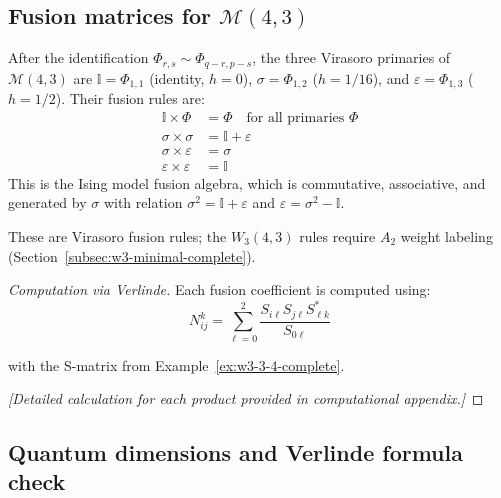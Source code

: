 \subsection{\texorpdfstring{Fusion matrices for $\mathcal{M}(4,3)$}{Fusion matrices for M(4,3)}}
\label{subsec:fusion-matrices-3-4}

\begin{theorem}\label{thm:fusion-3-4-complete}
After the identification $\Phi_{r,s} \sim \Phi_{q-r,p-s}$, the three Virasoro primaries of $\mathcal{M}(4,3)$ are $\mathbb{I} = \Phi_{1,1}$ (identity, $h=0$), $\sigma = \Phi_{1,2}$ ($h=1/16$), and $\varepsilon = \Phi_{1,3}$ ($h=1/2$).  Their fusion rules are:
\begin{align}
\mathbb{I} \times \Phi &= \Phi \quad \text{for all primaries } \Phi \\
\sigma \times \sigma &= \mathbb{I} + \varepsilon \\
\sigma \times \varepsilon &= \sigma \\
\varepsilon \times \varepsilon &= \mathbb{I}
\end{align}
This is the Ising model fusion algebra, which is commutative, associative, and generated by $\sigma$ with relation $\sigma^2 = \mathbb{I} + \varepsilon$ and $\varepsilon = \sigma^2 - \mathbb{I}$.
\end{theorem}

\begin{remark}
These are Virasoro fusion rules; the $W_3(4,3)$ rules require $A_2$ weight labeling (Section~\ref{subsec:w3-minimal-complete}).
\end{remark}

\begin{proof}[Computation via Verlinde]
Each fusion coefficient is computed using:
\[N_{ij}^k = \sum_{\ell=0}^{2} \frac{S_{i\ell}S_{j\ell}S_{\ell k}^*}{S_{0\ell}}\]

with the S-matrix from Example~\ref{ex:w3-3-4-complete}.

\emph{[Detailed calculation for each product provided in computational appendix.]}
\end{proof}

\subsection{Quantum dimensions and Verlinde formula check}
\label{subsec:quantum-dimensions}


